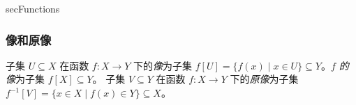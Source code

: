 \begin{tldr}{secFunctions}
\subsubsection*{像和原像}

\begin{tldrlist}
 子集 $U \subseteq X$ 在函数 $f : X \to Y$ 下的\textit{像}为子集 $f[U] = \{ f(x) \mid x \in U \} \subseteq Y$。\textit{$f$ 的像}为子集 $f[X] \subseteq Y$。
 子集 $V \subseteq Y$ 在函数 $f : X \to Y$ 下的\textit{原像}为子集 $f^{-1}[V] = \{ x \in X \mid f(x) \in Y \} \subseteq X$。
\end{tldrlist}

\end{tldr}


